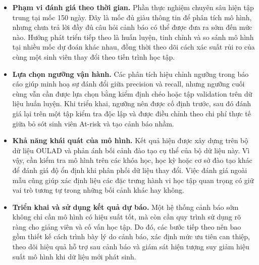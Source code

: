 \documentclass[a4paper]{report}
\begin{document}
\begin{itemize}[leftmargin=*]
  \item \textbf{Phạm vi đánh giá theo thời gian.} Phần thực nghiệm chuyên sâu
        hiện tập trung tại mốc 150 ngày. Đây là mốc đủ giàu thông tin để phân
        tích mô hình, nhưng chưa trả lời đầy đủ câu hỏi cảnh báo có thể được
        đưa ra sớm đến mức nào. Hướng phát triển tiếp theo là huấn luyện, tinh
        chỉnh và so sánh mô hình tại nhiều mốc dự đoán khác nhau, đồng thời
        theo dõi cách xác suất rủi ro của cùng một sinh viên thay đổi theo tiến
        trình học tập.
  \item \textbf{Lựa chọn ngưỡng vận hành.} Các phân tích hiệu chỉnh ngưỡng trong
        báo cáo giúp minh hoạ sự đánh đổi giữa precision và recall, nhưng ngưỡng
        cuối cùng vẫn cần được lựa chọn bằng kiểm định chéo hoặc tập validation
        trên dữ liệu huấn luyện. Khi triển khai, ngưỡng nên được cố định trước,
        sau đó đánh giá lại trên một tập kiểm tra độc lập và được điều chỉnh
        theo chi phí thực tế giữa bỏ sót sinh viên At-risk và tạo cảnh báo nhầm.
  \item \textbf{Khả năng khái quát của mô hình.} Kết quả hiện được xây dựng trên
        bộ dữ liệu OULAD và phản ánh bối cảnh đào tạo cụ thể của bộ dữ liệu này.
        Vì vậy, cần kiểm tra mô hình trên các khóa học, học kỳ hoặc cơ sở đào
        tạo khác để đánh giá độ ổn định khi phân phối dữ liệu thay đổi. Việc
        đánh giá ngoài mẫu cũng giúp xác định liệu các đặc trưng hành vi học
        tập quan trọng có giữ vai trò tương tự trong những bối cảnh khác hay
        không.
  \item \textbf{Triển khai và sử dụng kết quả dự báo.} Một hệ thống cảnh báo sớm
        không chỉ cần mô hình có hiệu suất tốt, mà còn cần quy trình sử dụng rõ
        ràng cho giảng viên và cố vấn học tập. Do đó, các bước tiếp theo nên bao
        gồm thiết kế cách trình bày lý do cảnh báo, xác định mức ưu tiên can
        thiệp, theo dõi hiệu quả hỗ trợ sau cảnh báo và giám sát hiện tượng suy
        giảm hiệu suất mô hình khi dữ liệu mới phát sinh.
\end{itemize}

\clearpage
\renewcommand{\bibname}{Tài liệu tham khảo}
\end{document}
